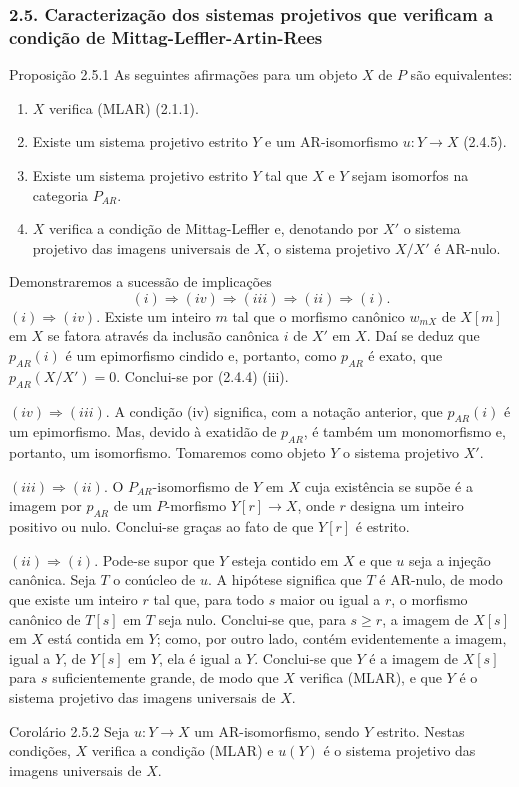 \subsubsection*{2.5. Caracterização dos sistemas projetivos que verificam a condição de Mittag-Leffler-Artin-Rees}
\begin{statement}{Proposição 2.5.1}
As seguintes afirmações para um objeto $X$ de $P$ são equivalentes:
\begin{enumerate}[label=(\roman*)]
\item $X$ verifica (MLAR) (2.1.1).
\item Existe um sistema projetivo estrito $Y$ e um AR-isomorfismo $u:Y\to X$ (2.4.5).
\item Existe um sistema projetivo estrito $Y$ tal que $X$ e $Y$ sejam isomorfos na categoria $P_{AR}$.
\item $X$ verifica a condição de Mittag-Leffler e, denotando por $X'$ o sistema projetivo das imagens universais de $X$, o sistema projetivo $X/X'$ é AR-nulo.
\end{enumerate}
\end{statement}

\begin{prooftext}[Demonstração]
Demonstraremos a sucessão de implicações
\[
(i)\Rightarrow(iv)\Rightarrow(iii)\Rightarrow(ii)\Rightarrow(i).
\]
$(i)\Rightarrow(iv)$. Existe um inteiro $m$ tal que o morfismo canônico $w_{mX}$ de $X[m]$ em $X$ se fatora através da inclusão canônica $i$ de $X'$ em $X$. Daí se deduz que $p_{AR}(i)$ é um epimorfismo cindido e, portanto, como $p_{AR}$ é exato, que $p_{AR}(X/X')=0$. Conclui-se por (2.4.4) (iii).

$(iv)\Rightarrow(iii)$. A condição (iv) significa, com a notação anterior, que $p_{AR}(i)$ é um epimorfismo. Mas, devido à exatidão de $p_{AR}$, é também um monomorfismo e, portanto, um isomorfismo. Tomaremos como objeto $Y$ o sistema projetivo $X'$.

$(iii)\Rightarrow(ii)$. O $P_{AR}$-isomorfismo de $Y$ em $X$ cuja existência se supõe é a imagem por $p_{AR}$ de um $P$-morfismo $Y[r]\to X$, onde $r$ designa um inteiro positivo ou nulo. Conclui-se graças ao fato de que $Y[r]$ é estrito.

$(ii)\Rightarrow(i)$. Pode-se supor que $Y$ esteja contido em $X$ e que $u$ seja a injeção canônica. Seja $T$ o conúcleo de $u$. A hipótese significa que $T$ é AR-nulo, de modo que existe um inteiro $r$ tal que, para todo $s$ maior ou igual a $r$, o morfismo canônico de $T[s]$ em $T$ seja nulo. Conclui-se que, para $s\ge r$, a imagem de $X[s]$ em $X$ está contida em $Y$; como, por outro lado, contém evidentemente a imagem, igual a $Y$, de $Y[s]$ em $Y$, ela é igual a $Y$. Conclui-se que $Y$ é a imagem de $X[s]$ para $s$ suficientemente grande, de modo que $X$ verifica (MLAR), e que $Y$ é o sistema projetivo das imagens universais de $X$.
\end{prooftext}

\begin{statement}{Corolário 2.5.2}
Seja $u:Y\to X$ um AR-isomorfismo, sendo $Y$ estrito. Nestas condições, $X$ verifica a condição (MLAR) e $u(Y)$ é o sistema projetivo das imagens universais de $X$.
\end{statement}

